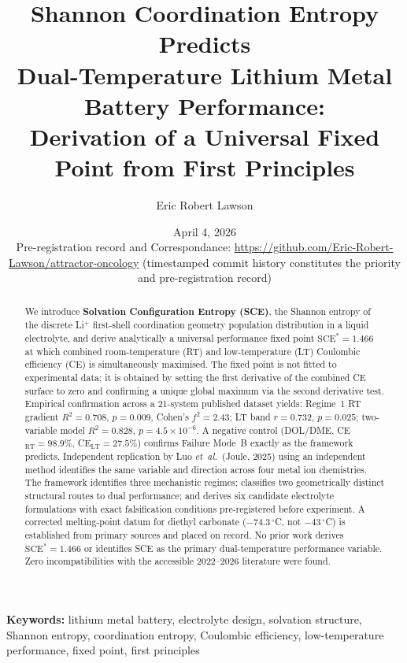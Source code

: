 \documentclass[11pt]{article}
\title{\textbf{Shannon Coordination Entropy Predicts\\
Dual-Temperature Lithium Metal Battery Performance:\\
Derivation of a Universal Fixed Point from First Principles}}
\author[1]{Eric Robert Lawson}
\affil[1]{Independent Researcher, OrganismCore Initiative\\
\texttt{ORCID: 0009-0002-0414-6544}\\
Repository: \url{https://github.com/Eric-Robert-Lawson/attractor-oncology}}
\date{April 4, 2026\\
\small Pre-registration record and Correspondance: \url{https://github.com/Eric-Robert-Lawson/attractor-oncology}
(timestamped commit history constitutes the priority and pre-registration record)}
\theoremstyle{plain}
\theoremstyle{definition}
\theoremstyle{remark}
\begin{document}
\maketitle

\begin{abstract}
We introduce \textbf{Solvation Configuration Entropy (SCE)}, the Shannon entropy of the
discrete Li$^{+}$ first-shell coordination geometry population distribution in a liquid
electrolyte, and derive analytically a universal performance fixed point
$\text{SCE}^{*} = 1.466$ at which combined room-temperature (RT) and
low-temperature (LT) Coulombic efficiency (CE) is simultaneously maximised.
The fixed point is not fitted to experimental data; it is obtained by setting the
first derivative of the combined CE surface to zero and confirming a unique global
maximum via the second derivative test.  Empirical confirmation across a 21-system
published dataset yields: Regime~1 RT gradient $R^{2}=0.708$, $p=0.009$, Cohen's
$f^{2}=2.43$; LT band $r=0.732$, $p=0.025$; two-variable model $R^{2}=0.828$,
$p=4.5\times10^{-6}$.  A negative control (DOL/DME, CE$_{\text{RT}}=98.9\%$,
CE$_{\text{LT}}=27.5\%$) confirms Failure Mode~B exactly as the framework predicts.
Independent replication by Luo \textit{et~al.}\ (Joule, 2025) using an independent
method identifies the same variable and direction across four metal ion chemistries.
The framework identifies three mechanistic regimes; classifies two geometrically
distinct structural routes to dual performance; and derives six candidate electrolyte
formulations with exact falsification conditions pre-registered before experiment.
A corrected melting-point datum for diethyl carbonate ($-74.3\,^{\circ}$C, not
$-43\,^{\circ}$C) is established from primary sources and placed on record.
No prior work derives $\text{SCE}^{*} = 1.466$ or identifies SCE as the primary
dual-temperature performance variable.  Zero incompatibilities with the accessible
2022--2026 literature were found.
\end{abstract}

\vspace{1em}
\noindent\textbf{Keywords:} lithium metal battery, electrolyte design, solvation
structure, Shannon entropy, coordination entropy, Coulombic efficiency,
low-temperature performance, fixed point, first principles

\tableofcontents
\newpage

\end{document}
